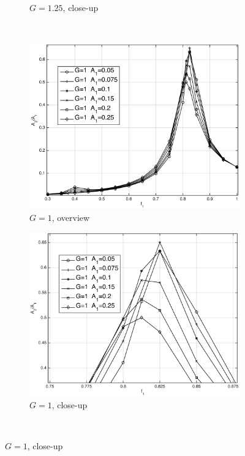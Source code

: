 \begin{figure}[p]
\begin{subfigure}[t]{\widthp\textwidth}
		\caption{$ G=1.25 $, close-up}
		\label{fig:g125a2da1details}
	\end{subfigure}\\%
	\begin{subfigure}[t]{\widthp\textwidth}
		\centering
		\includegraphics[width=\linewidth]{Figs/G=1_A2dA1}
		\caption{$ G=1 $, overview}
		\label{fig:g1a2da1}
	\end{subfigure}%
	\begin{subfigure}[t]{\widthp\textwidth}
		\centering
		\includegraphics[width=\linewidth]{Figs/G=1_A2dA1_details}
		\caption{$ G=1 $, close-up}
		\label{fig:g1a2da1details}
	\end{subfigure}\\%

\end{figure}
